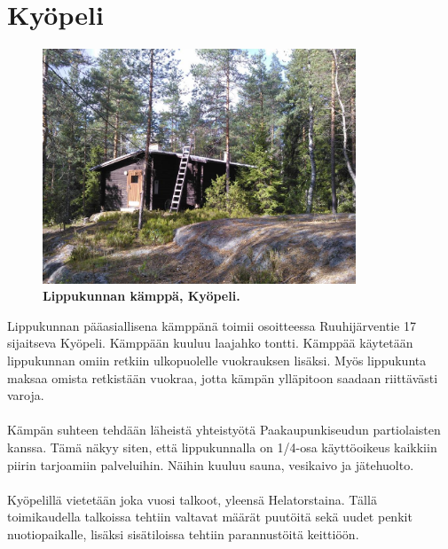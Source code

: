 \section{Kyöpeli}
\begin{figure}[htb]
	\begin{center}
		\includegraphics[height=7cm]{kuvat/kyopeli.jpg}
	\end{center}
	\captionsetup{labelformat=empty}
	\caption{\textbf{Lippukunnan kämppä, Kyöpeli.}}
\end{figure}

Lippukunnan pääasiallisena kämppänä toimii osoitteessa Ruuhijärventie 17 sijaitseva Kyöpeli. Kämppään kuuluu laajahko tontti. Kämppää käytetään lippukunnan omiin retkiin ulkopuolelle vuokrauksen lisäksi. Myös lippukunta maksaa omista retkistään vuokraa, jotta kämpän ylläpitoon saadaan riittävästi varoja.\\
\\Kämpän suhteen tehdään läheistä yhteistyötä Paakaupunkiseudun partiolaisten kanssa. Tämä näkyy siten, että lippukunnalla on 1/4-osa käyttöoikeus kaikkiin piirin tarjoamiin palveluihin. Näihin kuuluu sauna, vesikaivo ja jätehuolto.\\
\\Kyöpelillä vietetään joka vuosi talkoot, yleensä Helatorstaina. Tällä toimikaudella talkoissa tehtiin valtavat määrät puutöitä sekä uudet penkit nuotiopaikalle, lisäksi sisätiloissa tehtiin parannustöitä keittiöön.
